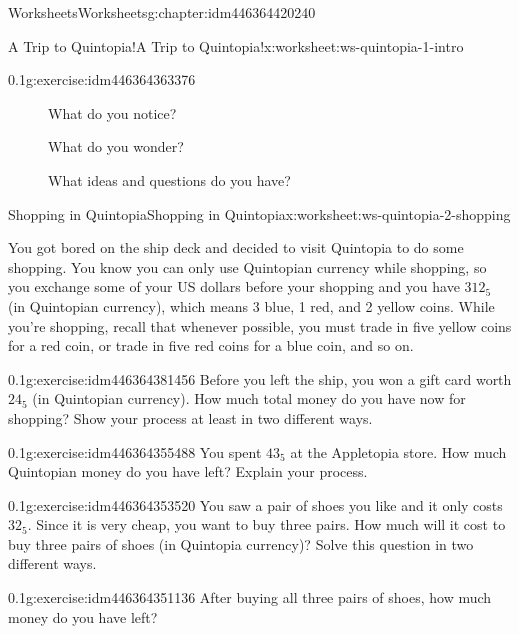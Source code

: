 \documentclass[twoside,11pt,]{book}
\begin{document}
\begin{chapterptx}{Worksheets}{}{Worksheets}{}{}{g:chapter:idm446364420240}
\begin{worksheet-section-numberless}{A Trip to Quintopia!}{}{A Trip to Quintopia!}{}{}{x:worksheet:ws-quintopia-1-intro}
\begin{divisionexercise}{2}{}{0.1}{g:exercise:idm446364363376}
\begin{description}
\item[{}]What do you notice?\item[{}]What do you wonder?\item[{}]What ideas and questions do you have?\end{description}
\end{divisionexercise}%
\end{worksheet-section-numberless}
\restoregeometry
%
%
\typeout{************************************************}
\typeout{************************************************}
%
\begin{worksheet-section-numberless}{Shopping in Quintopia}{}{Shopping in Quintopia}{}{}{x:worksheet:ws-quintopia-2-shopping}
\begin{introduction}{}%
You got bored on the ship deck and decided to visit Quintopia to do some shopping. You know you can only use Quintopian currency while shopping, so you exchange some of your US dollars before your shopping and you have \(312_{5}\) (in Quintopian currency), which means 3 blue, 1 red, and 2 yellow coins. While you’re shopping, recall that whenever possible, you must trade in five yellow coins for a red coin, or trade in five red coins for a blue coin, and so on.%
\end{introduction}%
\begin{divisionexercise}{1}{}{0.1}{g:exercise:idm446364381456}%
Before you left the ship, you won a gift card worth \(24_{5}\) (in Quintopian currency). How much total money do you have now for shopping? Show your process at least in two different ways.%
\end{divisionexercise}%
\begin{divisionexercise}{2}{}{0.1}{g:exercise:idm446364355488}%
You spent \(43_{5}\) at the Appletopia store. How much Quintopian money do you have left?  Explain your process.%
\end{divisionexercise}%
\begin{divisionexercise}{3}{}{0.1}{g:exercise:idm446364353520}%
You saw a pair of shoes you like and it only costs \(32_{5}\). Since it is very cheap, you want to buy three pairs. How much will it cost to buy three pairs of shoes (in Quintopia currency)? Solve this question in two different ways.%
\end{divisionexercise}%
\clearpage
\begin{divisionexercise}{4}{}{0.1}{g:exercise:idm446364351136}%
After buying all three pairs of shoes, how much money do you have left?%

\end{divisionexercise}
\end{worksheet-section-numberless}
\end{chapterptx}
\end{document}
